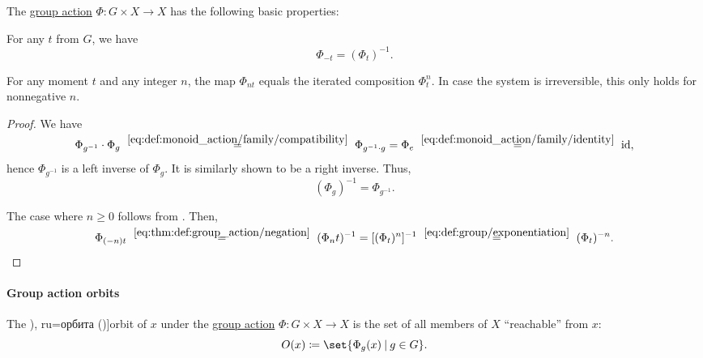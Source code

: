 \begin{proposition}\label{thm:def:group_action}
  The \hyperref[def:group_action]{group action} \( \Phi: G \times X \to X \) has the following basic properties:
  \begin{thmenum}
     For any \( t \) from \( G \), we have
    \begin{equation}\label{eq:thm:def:group_action/negation}
      \Phi_{-t} = (\Phi_t)^{-1}.
    \end{equation}

     For any moment \( t \) and any integer \( n \), the map \( \Phi_{nt} \) equals the iterated composition \( \Phi_t^n \). In case the system is irreversible, this only holds for nonnegative \( n \).
  \end{thmenum}
\end{proposition}
\begin{proof}
   We have
  \begin{equation*}
    \Phi_{g^{-1}} \cdot \Phi_g
    \reloset {\eqref{eq:def:monoid_action/family/compatibility}} =
    \Phi_{g^{-1} \cdot g}
    =
    \Phi_e
    \reloset {\eqref{eq:def:monoid_action/family/identity}} =
    \id,
  \end{equation*}
  hence \( \Phi_{g^{-1}} \) is a left inverse of \( \Phi_g \). It is similarly shown to be a right inverse. Thus,
  \begin{equation*}
    (\Phi_g)^{-1} = \Phi_{g^{-1}}.
  \end{equation*}

   The case where \( n \geq 0 \) follows from . Then,
  \begin{equation*}
    \Phi_{(-n)t}
    \reloset {\eqref{eq:thm:def:group_action/negation}} =
    (\Phi_nt)^{-1}
    =
    [(\Phi_t)^n]^{-1}
    \reloset {\eqref{eq:def:group/exponentiation}} =
    (\Phi_t)^{-n}.
  \end{equation*}
\end{proof}

\paragraph{Group action orbits}

\begin{definition}\label{def:group_action_orbit}
  The \term[bg=орбита (\cite[def. IV.20]{ГеновМиховскиМоллов1991Алгебра}), ru=орбита (\cite[179]{Винберг2014КурсАлгебры})]{orbit} of \( x \) under the \hyperref[def:group_action]{group action} \( \Phi: G \times X \to X \) is the set of all members of \( X \) \enquote{reachable} from \( x \):
  \begin{equation*}
    O(x) \coloneqq \set{ \Phi_g(x) \given g \in G }.
  \end{equation*}
\end{definition}

